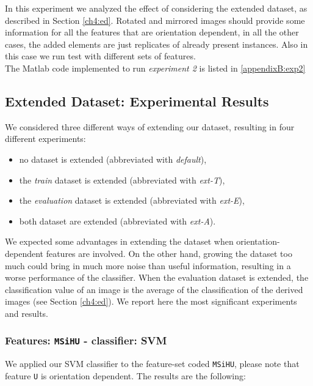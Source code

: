 In this experiment we analyzed the effect of considering the extended dataset, as described in Section \ref{ch4:ed}. Rotated and mirrored images should provide some information for
all the features that are orientation dependent, in all the other cases, the added elements are just replicates of already present instances.
Also in this case we run test with different sets of features.
\\
The Matlab code implemented to run \textit{experiment 2} is listed in \ref{appendixB:exp2}


\vspace{0.5cm}

\subsection{Extended Dataset: Experimental Results}

We considered three different ways of extending our dataset, resulting in four different experiments:

\begin{itemize}
 \item no dataset is extended (abbreviated with \textit{default}),
 \item the \textit{train} dataset is extended (abbreviated with \textit{ext-T}),
 \item the \textit{evaluation} dataset is extended (abbreviated with \textit{ext-E}),
 \item both dataset are extended (abbreviated with \textit{ext-A}). 
\end{itemize}

We expected some advantages in extending the dataset when orientation-dependent features are involved. On the other hand,
growing the dataset too much could bring in much more noise than useful information, resulting in a worse performance of the classifier.
When the evaluation dataset is extended, the classification value of an image is the average of the classification of the derived images (see Section \ref{ch4:ed}).
We report here the most significant experiments and results.

\vspace{0.5cm}

\subsubsection{Features: \texttt{MSiHU} - classifier: SVM}

We applied our \Gls{SVM} classifier to the feature-set coded \texttt{MSiHU}, please note that feature \texttt{U} is orientation dependent. The results are the following:


